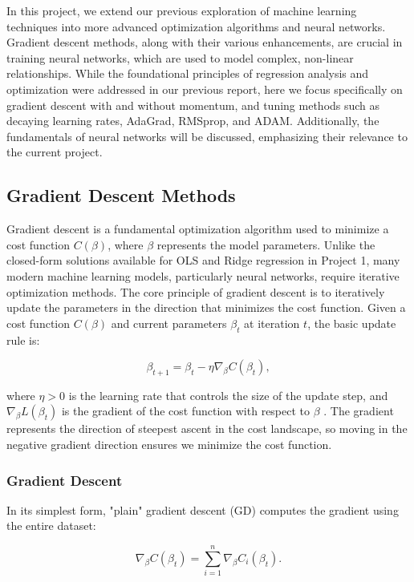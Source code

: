 
In this project, we extend our previous exploration of machine learning techniques into more advanced optimization algorithms and neural networks. Gradient descent methods, along with their various enhancements, are crucial in training neural networks, which are used to model complex, non-linear relationships. While the foundational principles of regression analysis and optimization were addressed in our previous report, here we focus specifically on gradient descent with and without momentum, and tuning methods such as decaying learning rates, AdaGrad, RMSprop, and ADAM. Additionally, the fundamentals of neural networks will be discussed, emphasizing their relevance to the current project.

\subsection{Gradient Descent Methods}

Gradient descent is a fundamental optimization algorithm used to minimize a cost function \( C(\beta) \), where \( \beta \) represents the model parameters. Unlike the closed-form solutions available for OLS and Ridge regression in Project 1, many modern machine learning models, particularly neural networks, require iterative optimization methods. The core principle of gradient descent is to iteratively update the parameters in the direction that minimizes the cost function. Given a cost function \( C(\beta) \) and current parameters \( \beta_t \) at iteration \(t\), the basic update rule is:

\begin{equation}
    \beta_{t+1} = \beta_t - \eta \nabla_\beta C(\beta_t),
\end{equation}

where \( \eta > 0 \) is the learning rate that controls the size of the update step, and \( \nabla_\beta L(\beta_t) \) is the gradient of the cost function with respect to \( \beta \) . The gradient represents the direction of steepest ascent in the cost landscape, so moving in the negative gradient direction ensures we minimize the cost function.

\subsubsection{Gradient Descent}

In its simplest form, "plain" gradient descent (GD) computes the gradient using the entire dataset:

\begin{equation}
    \nabla_\beta C(\beta_t) = \sum_{i=1}^{n} \nabla_\beta C_i(\beta_t).
\end{equation}


